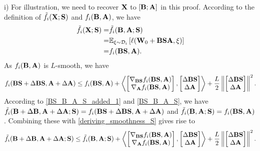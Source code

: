 \documentclass{article} %
\theoremstyle{plain}
\theoremstyle{definition}
\begin{document}
i) For illustration, we need to recover \(\bf X\) to \([\bf B; {\bf A}]\) in this proof. According to the definition of \(\tilde{f}_{i} ({\bf X}; {\bf S})\) and \(f_{i} ({\bf B},{\bf A})\), we have
\begin{align}
    \tilde{f}_{i} ({\bf X}; {\bf S}) =& \tilde{f}_{i} ({\bf B}, {\bf A}; {\bf S}) \label{BS_B_A_S_added_1} \\ 
    =&  \mathbb{E}_{\xi \sim \mathcal{D}_i} \left[ \ell ({\bf W}_{0} + {\bf B} {\bf S}{\bf A}, \xi)\right]  \nonumber \\
    = & f_{i} ({\bf B} {\bf S}, {\bf A}). \label{BS_B_A_S}
\end{align}
As \(f_{i} ({\bf B},{\bf A}) \) is \(L\)-smooth, we have
\begin{align}\label{deriving_smoothness_S}
    f_{i} ({\bf B} {\bf S} + \Delta {\bf B} {\bf S}, {\bf A}+ \Delta{\bf A}) \leq f_{i} ({\bf B} {\bf S},{\bf A}) + 
    \left \langle \begin{bmatrix}
       \nabla_{{\bf B}\bf S} f_{i} ({\bf B} {\bf S},{\bf A}) \\
       \nabla_{\bf A} f_{i} ({\bf B} {\bf S},{\bf A}) 
    \end{bmatrix}, 
    \begin{bmatrix}
        \Delta {\bf B} {\bf S}\\
         \Delta {\bf A}  
    \end{bmatrix}
    \right \rangle + \frac{L}{2} \left \| \begin{bmatrix}
       \Delta {\bf B} {\bf S}\\
         \Delta {\bf A}
    \end{bmatrix} \right \|^2. 
\end{align}
According to \eqref{BS_B_A_S_added_1} and \eqref{BS_B_A_S}, we have \(\tilde{f}_{i} ({\bf B} + \Delta {\bf B} , {\bf A}+ \Delta{\bf A}; {\bf S}) =  f_{i} ({\bf B} {\bf S} + \Delta {\bf B} {\bf S}, {\bf A}+ \Delta{\bf A})\) and \( \tilde{f}_{i} ({\bf B},{\bf A}; {\bf S}) = f_{i} ({\bf B} {\bf S},{\bf A})\). Combining these with \eqref{deriving_smoothness_S} gives rise to
\begin{align}\label{B_A_S_new}
    \tilde{f}_{i} ({\bf B} + \Delta {\bf B} , {\bf A}+ \Delta{\bf A}; {\bf S}) \leq \tilde{f}_{i} ({\bf B},{\bf A}; {\bf S}) + 
    \left \langle \begin{bmatrix}
       \nabla_{{\bf B}\bf S} f_{i} ({\bf B} {\bf S},{\bf A}) \\
       \nabla_{\bf A} f_{i} ({\bf B} {\bf S},{\bf A}) 
    \end{bmatrix}, 
    \begin{bmatrix}
        \Delta {\bf B} {\bf S}\\
         \Delta {\bf A}  
    \end{bmatrix}
    \right \rangle + \frac{L}{2} \left \| \begin{bmatrix}
       \Delta {\bf B} {\bf S}\\
         \Delta {\bf A} 
    \end{bmatrix} \right \|^2. 
\end{align}
\end{document}
